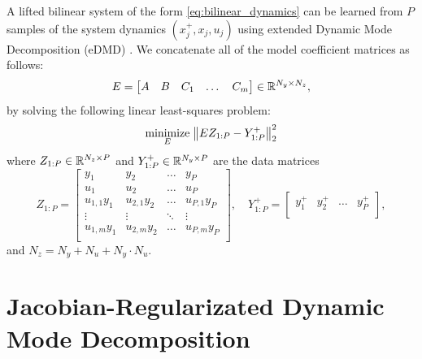 \documentclass{article}
\begin{document}
A lifted bilinear system of the form \eqref{eq:bilinear_dynamics} can be learned from $P$
samples of the system dynamics $(x_j^+,x_j,u_j)$ using extended Dynamic Mode Decomposition
(eDMD) \cite{Williams2015,Folkestad2021}. We concatenate all of the model coefficient
matrices as follows:
\begin{equation} \label{eq:E_matrixdef}
  E = \begin{bmatrix} A & B & C_1 & \dots & C_m \end{bmatrix} \in \mathbb{R}^{N_y \times N_z},
\end{equation}
by solving the following linear least-squares problem:
\begin{align} \label{opt:edmd}
  \underset{E}{\text{minimize}} \; \norm{E Z_{1:P} - Y_{1:P}^+}_2^2
\end{align}
where $Z_{1:P} \in \mathbb{R}^{N_z \times P}$ and $Y_{1:P}^+ \in \mathbb{R}^{N_y \times P}$ are the data 
matrices 
\begin{equation}
  Z_{1:P} = \begin{bmatrix}
    y_1         & y_2         & \dots  & y_P          \\
    u_1         & u_2         & \dots  & u_P          \\
    u_{1,1} y_1 & u_{2,1} y_2 & \dots  & u_{P,1} y_P  \\
    \vdots      & \vdots      & \ddots & \vdots       \\
    u_{1,m} y_1 & u_{2,m} y_2 & \dots  & u_{P,m} y_P  \\
  \end{bmatrix}, \quad 
  Y_{1:P}^+ = \begin{bmatrix}
    y_1^+         & y_2^+         & \dots  & y_P^+    \\
  \end{bmatrix},
\end{equation}
and $N_z = N_y + N_u + N_y \cdot N_u$.


\section{Jacobian-Regularizated Dynamic Mode Decomposition} \label{sec:jdmd}

\end{document}
